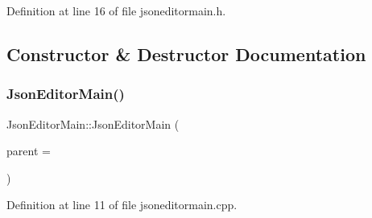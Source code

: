 Definition at line 16 of file jsoneditormain.\+h.



\subsection{Constructor \& Destructor Documentation}
\mbox{\label{class_json_editor_main_a26035af11b29baf46d5fd32c288501f0}} 
\subsubsection{\texorpdfstring{Json\+Editor\+Main()}{JsonEditorMain()}}
{\footnotesize\ttfamily Json\+Editor\+Main\+::\+Json\+Editor\+Main (\begin{DoxyParamCaption}\item[{Q\+Widget $\ast$}]{parent = {} }\end{DoxyParamCaption})}



Definition at line 11 of file jsoneditormain.\+cpp.


